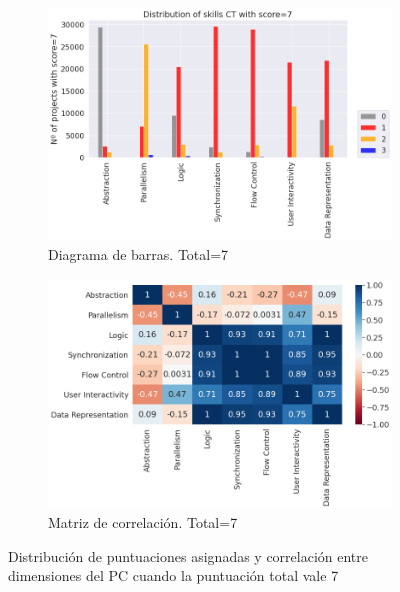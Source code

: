 \documentclass[a4paper, 12pt]{book}
\begin{document}
\begin{figure}[H]
    \centering
    \begin{subfigure}[h]{.49\textwidth} 
        \includegraphics[width=\textwidth]{img/distribucion_7_Scratch}
        \caption{Diagrama de barras. Total=7}
        \label{fig:total7}
    \end{subfigure}       
    \begin{subfigure}[h]{.49\textwidth} 
        \includegraphics[width=\textwidth]{img/corr_7_Scratch}
        \caption{Matriz de correlación. Total=7}
        \label{fig:corr7}
    \end{subfigure}
     \caption{Distribución de puntuaciones asignadas y correlación entre dimensiones del PC cuando la puntuación total vale 7}
\end{figure}
\end{document}
